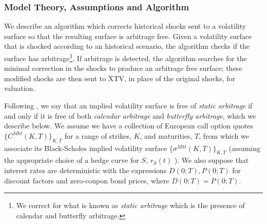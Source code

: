 \documentclass[11pt,letterpaper]{article}
\begin{document}
\subsubsection{Model Theory, Assumptions and Algorithm}

We describe an algorithm which corrects historical shocks sent to a volatility surface so that the resulting surface is arbitrage free. Given a volatility surface that is shocked according to an historical scenario, the algorithm checks if the surface has arbitrage\footnote{We correct for what is known as \textit{static arbitrage} which is the presence of calendar and butterfly arbitrage.}. If arbitrage is detected, the algorithm searches for the minimal correction in the shocks to produce an arbitrage free surface; these modified shocks are then sent to XTV, in place of the original shocks, for valuation. 

\label{sss:arb}
Following \cite{gatheral2014arbitrage}, we say that an implied volatility surface is free of \textit{static arbitrage} if and only if it is free of both \textit{calendar arbitrage} and \textit{butterfly arbitrage}, which we describe below. We assume we have a collection of European call option quotes $\{C^{Mkt}(K,T)\}_{K,T}$ for a range of strikes, $K$, and maturities, $T$, from which we associate its Black-Scholes implied volatility surface $\{ \sigma^{Mkt}(K,T)\}_{K,T}$ (assuming the appropriate choice of a hedge curve for $S$, $r_S(t)$ ). We also suppose that interest rates are deterministic with the expressions $D(0;T), P(0;T)$ for discount factors and zero-coupon bond prices, where $D(0;T) = P(0;T)$. 
\end{document}
